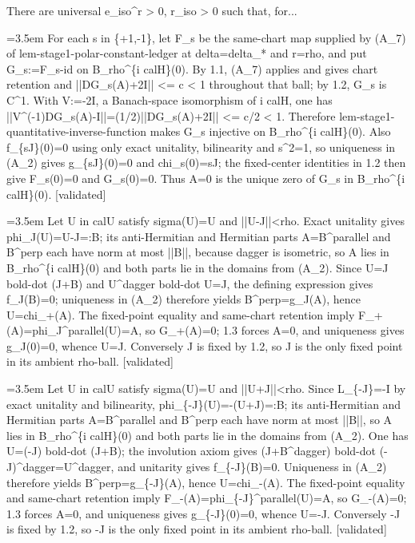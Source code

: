\documentclass{article}
\newcommand{\step}[1]{\par\noindent\hangindent=3.5em\hangafter=1%
  \makebox[3.5em][l]{\textbf{#1.}}}
\newcommand{\steptag}[1]{\hfill{\small\textsf{[#1]}}}
\begin{document}
\begin{proofbox}{There are universal e\_iso\textasciicircum{}r > 0, r\_iso > 0 such that, for...}
\step{1.3} For each s in \{+1,-1\}, let F\_s be the same-chart map supplied by (A\_7) of lem-stage1-polar-constant-ledger at delta=delta\_* and r=rho, and put G\_s:=F\_s-id on B\_rho\textasciicircum{}\{i calH\}(0). By 1.1, (A\_7) applies and gives chart retention and ||DG\_s(A)+2I|| <= c < 1 throughout that ball; by 1.2, G\_s is C\textasciicircum{}1. With V:=-2I, a Banach-space isomorphism of i calH, one has ||V\textasciicircum{}(-1)DG\_s(A)-I||=(1/2)||DG\_s(A)+2I|| <= c/2 < 1. Therefore lem-stage1-quantitative-inverse-function makes G\_s injective on B\_rho\textasciicircum{}\{i calH\}(0). Also f\_\{sJ\}(0)=0 using only exact unitality, bilinearity and s\textasciicircum{}2=1, so uniqueness in (A\_2) gives g\_\{sJ\}(0)=0 and chi\_s(0)=sJ; the fixed-center identities in 1.2 then give F\_s(0)=0 and G\_s(0)=0. Thus A=0 is the unique zero of G\_s in B\_rho\textasciicircum{}\{i calH\}(0). \steptag{validated} \\[4pt]
\step{1.4} Let U in calU satisfy sigma(U)=U and ||U-J||<rho. Exact unitality gives phi\_J(U)=U-J=:B; its anti-Hermitian and Hermitian parts A=B\textasciicircum{}parallel and B\textasciicircum{}perp each have norm at most ||B||, because dagger is isometric, so A lies in B\_rho\textasciicircum{}\{i calH\}(0) and both parts lie in the domains from (A\_2). Since U=J bold-dot (J+B) and U\textasciicircum{}dagger bold-dot U=J, the defining expression gives f\_J(B)=0; uniqueness in (A\_2) therefore yields B\textasciicircum{}perp=g\_J(A), hence U=chi\_+(A). The fixed-point equality and same-chart retention imply F\_+(A)=phi\_J\textasciicircum{}parallel(U)=A, so G\_+(A)=0; 1.3 forces A=0, and uniqueness gives g\_J(0)=0, whence U=J. Conversely J is fixed by 1.2, so J is the only fixed point in its ambient rho-ball. \steptag{validated} \\[4pt]
\step{1.5} Let U in calU satisfy sigma(U)=U and ||U+J||<rho. Since L\_\{-J\}=-I by exact unitality and bilinearity, phi\_\{-J\}(U)=-(U+J)=:B; its anti-Hermitian and Hermitian parts A=B\textasciicircum{}parallel and B\textasciicircum{}perp each have norm at most ||B||, so A lies in B\_rho\textasciicircum{}\{i calH\}(0) and both parts lie in the domains from (A\_2). One has U=(-J) bold-dot (J+B); the involution axiom gives (J+B\textasciicircum{}dagger) bold-dot (-J)\textasciicircum{}dagger=U\textasciicircum{}dagger, and unitarity gives f\_\{-J\}(B)=0. Uniqueness in (A\_2) therefore yields B\textasciicircum{}perp=g\_\{-J\}(A), hence U=chi\_-(A). The fixed-point equality and same-chart retention imply F\_-(A)=phi\_\{-J\}\textasciicircum{}parallel(U)=A, so G\_-(A)=0; 1.3 forces A=0, and uniqueness gives g\_\{-J\}(0)=0, whence U=-J. Conversely -J is fixed by 1.2, so -J is the only fixed point in its ambient rho-ball. \steptag{validated} \\[6pt]

\end{proofbox}
\end{document}
